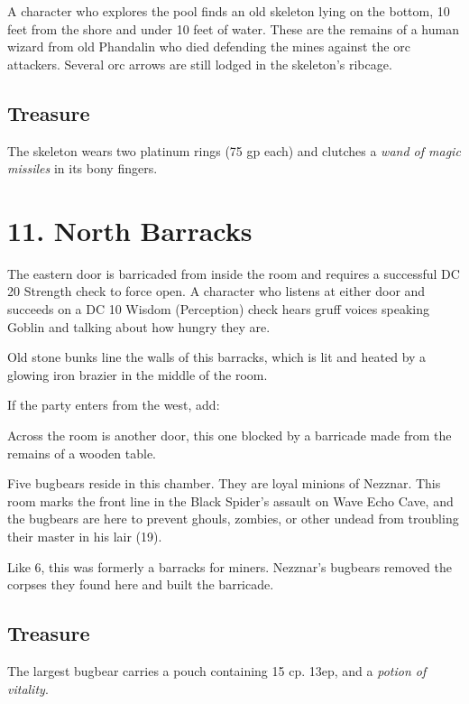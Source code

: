 \documentclass[10pt,a4paper,twoside,bg=print,twocolumn,openany,nodeprecatedcode]{dndbook}
\begin{document}
A character who explores the pool finds an old skeleton lying on the bottom, 10 feet from the shore and under 10 feet of water. These are the remains of a human wizard from old Phandalin who died defending the mines against the orc attackers. Several orc arrows are still lodged in the skeleton's ribcage.

\subsection{Treasure}
The skeleton wears two platinum rings (75 gp each) and clutches a \textit{wand of magic missiles} in its bony fingers.

\section{11. North Barracks}
The eastern door is barricaded from inside the room and requires a successful DC 20 Strength check to force open. A character who listens at either door and succeeds on a DC 10 Wisdom (Perception) check hears gruff voices speaking Goblin and talking about how hungry they are.

\begin{DndReadAloud}{}
Old stone bunks line the walls of this barracks, which is lit and heated by a glowing iron brazier in the middle of the room.

\end{DndReadAloud}

If the party enters from the west, add:

\begin{DndReadAloud}{}
Across the room is another door, this one blocked by a barricade made from the remains of a wooden table.

\end{DndReadAloud}

Five bugbears reside in this chamber. They are loyal minions of Nezznar. This room marks the front line in the Black Spider's assault on Wave Echo Cave, and the bugbears are here to prevent ghouls, zombies, or other undead from troubling their master in his lair (19).

Like 6, this was formerly a barracks for miners. Nezznar's bugbears removed the corpses they found here and built the barricade.

\subsection{Treasure}
The largest bugbear carries a pouch containing 15 cp. 13ep, and a \textit{potion of vitality}.
\end{document}
